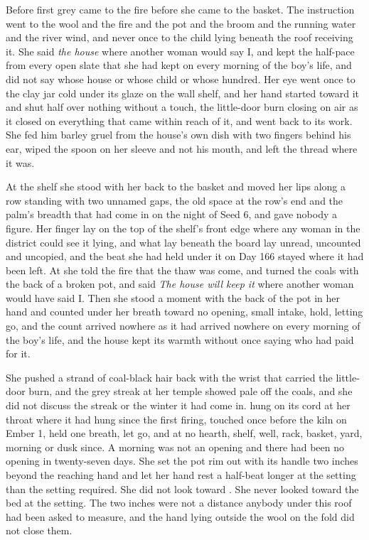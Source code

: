 Before first grey  came to the fire before she came to the basket. The instruction went to the wool and the fire and the pot and the broom and the running water and the river wind, and never once to the child lying beneath the roof receiving it. She said \emph{the house} where another woman would say I, and kept the half-pace from every open slate that she had kept on every morning of the boy's life, and did not say whose house or whose child or whose hundred. Her eye went once to the clay jar cold under its glaze on the wall shelf, and her hand started toward it and shut half over nothing without a touch, the little-door burn closing on air as it closed on everything that came within reach of it, and went back to its work. She fed him barley gruel from the house's own dish with two fingers behind his ear, wiped the spoon on her sleeve and not his mouth, and left the thread where it was.

At the shelf she stood with her back to the basket and moved her lips along a row standing with two unnamed gaps, the old space at the row's end and the palm's breadth that had come in on the night of Seed 6, and gave nobody a figure. Her finger lay on the top of the shelf's front edge where any woman in the district could see it lying, and what lay beneath the board lay unread, uncounted and uncopied, and the beat she had held under it on Day 166 stayed where it had been left. At  she told the fire that the thaw was come, and turned the coals with the back of a broken pot, and said \emph{The house will keep it} where another woman would have said I. Then she stood a moment with the back of the pot in her hand and counted under her breath toward no opening, small intake, hold, letting go, and the count arrived nowhere as it had arrived nowhere on every morning of the boy's life, and the house kept its warmth without once saying who had paid for it.

She pushed a strand of coal-black hair back with the wrist that carried the little-door burn, and the grey streak at her temple showed pale off the coals, and she did not discuss the streak or the winter it had come in.  hung on its cord at her throat where it had hung since the first firing, touched once before the kiln on Ember 1, held one breath, let go, and at no hearth, shelf, well, rack, basket, yard, morning or dusk since. A morning was not an opening and there had been no opening in twenty-seven days. She set the pot rim out with its handle two inches beyond the reaching hand and let her hand rest a half-beat longer at the setting than the setting required. She did not look toward . She never looked toward the bed at the setting. The two inches were not a distance anybody under this roof had been asked to measure, and the hand lying outside the wool on the fold did not close them.

